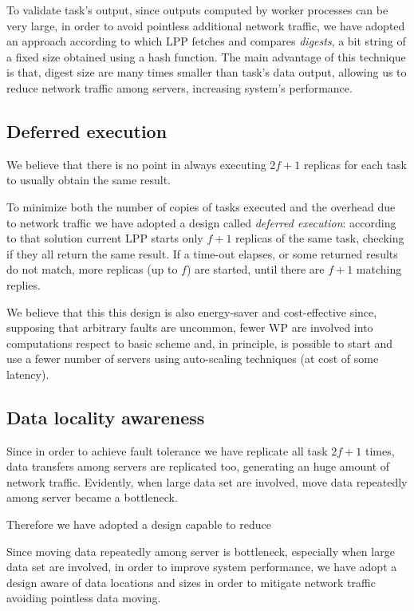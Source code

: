 \documentclass[sigchi]{acmart}
\begin{document}
To validate task's output, since outputs computed by worker processes can be very large, in order to avoid pointless additional network traffic, we have adopted an approach according to which LPP fetches and compares \textit{digests}, a bit string of a fixed size obtained using a hash function. The main advantage of this technique is that, digest size are many times smaller than task's data output, allowing us to reduce network traffic among servers, increasing system's performance.

\subsection{Deferred execution} We believe that there is no point in always executing $2f + 1$ replicas for each task to usually obtain the same result. 

To minimize both the number of copies of tasks executed and the overhead due to network traffic we have adopted a design called \textit{deferred execution}: according to that solution current LPP starts only $f + 1$ replicas of the same task, checking if they all return the same result. If a time-out elapses, or some returned results do not match, more replicas (up to $f$) are started, until there are $f + 1$ matching replies. 

We believe that this this design is also energy-saver and cost-effective since, supposing that arbitrary faults are uncommon, fewer WP are involved into computations respect to basic scheme and, in principle, is possible to start and use a fewer number of servers using auto-scaling techniques (at cost of some latency).

\subsection{Data locality awareness}

Since in order to achieve fault tolerance we have replicate all task $2f + 1$ times, data transfers among servers are replicated too, generating an huge amount of network traffic. Evidently, when large data set are involved, move data repeatedly among server became a bottleneck.

Therefore we have adopted a design capable to reduce 


Since moving data repeatedly among server is bottleneck, especially when large data set are involved, in order to improve system performance, we have adopt a design aware of data locations and sizes in order to mitigate network traffic avoiding pointless data moving.
\end{document}
